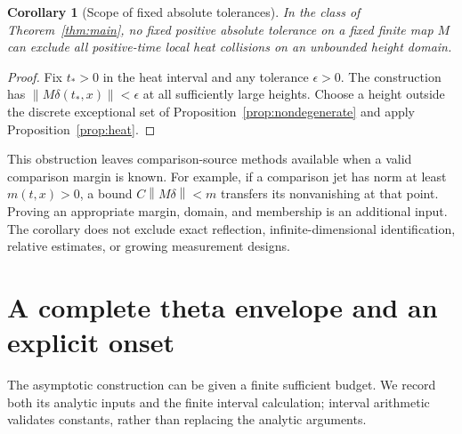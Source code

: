 \documentclass[11pt]{article}
\newtheorem{corollary}[theorem]{Corollary}
\theoremstyle{remark}\newtheorem{remark}[theorem]{Remark}
\newcommand{\norm}[1]{\left\lVert #1\right\rVert}
\begin{document}
\begin{corollary}[Scope of fixed absolute tolerances]\label{cor:obstruction}
In the class of Theorem~\ref{thm:main}, no fixed positive absolute tolerance on a fixed finite map $M$ can exclude all positive-time local heat collisions on an unbounded height domain.
\end{corollary}
\begin{proof}
Fix $t_*>0$ in the heat interval and any tolerance $\epsilon>0$. The construction has $\norm{M\delta(t_*,x)}<\epsilon$ at all sufficiently large heights. Choose a height outside the discrete exceptional set of Proposition~\ref{prop:nondegenerate} and apply Proposition~\ref{prop:heat}.
\end{proof}

This obstruction leaves comparison-source methods available when a valid comparison margin is known. For example, if a comparison jet has norm at least $m(t,x)>0$, a bound $C\norm{M\delta}<m$ transfers its nonvanishing at that point. Proving an appropriate margin, domain, and membership is an additional input. The corollary does not exclude exact reflection, infinite-dimensional identification, relative estimates, or growing measurement designs.

\section{A complete theta envelope and an explicit onset}\label{sec:quantitative}
The asymptotic construction can be given a finite sufficient budget. We record both its analytic inputs and the finite interval calculation; interval arithmetic validates constants, rather than replacing the analytic arguments.
\end{document}
